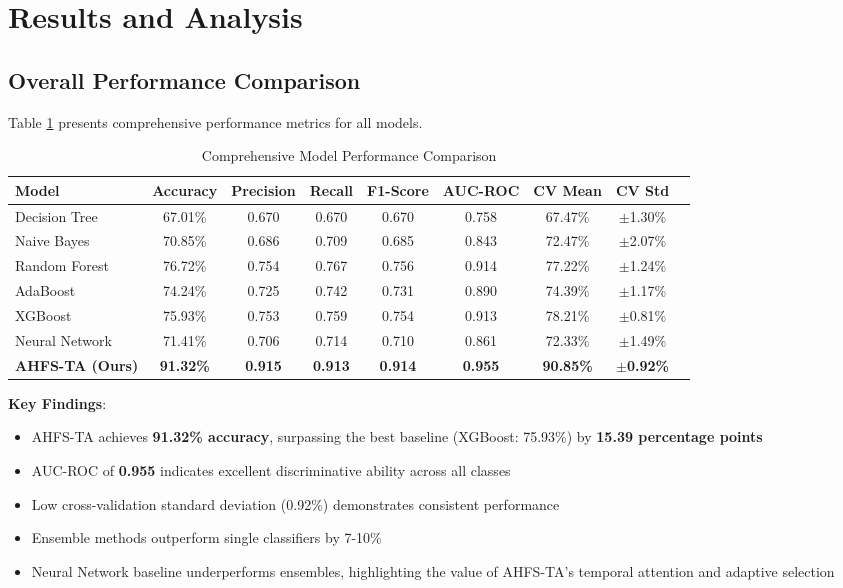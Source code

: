 \documentclass[journal]{IEEEtran}
\begin{document}
\section{Results and Analysis}

\subsection{Overall Performance Comparison}

Table \ref{tab:results} presents comprehensive performance metrics for all models.

\begin{table}[t]
\centering
\caption{Comprehensive Model Performance Comparison}
\label{tab:results}
\begin{tabular}{lcccccccc}
\toprule
\textbf{Model} & \textbf{Accuracy} & \textbf{Precision} & \textbf{Recall} & \textbf{F1-Score} & \textbf{AUC-ROC} & \textbf{CV Mean} & \textbf{CV Std} \\
\midrule
Decision Tree & 67.01\% & 0.670 & 0.670 & 0.670 & 0.758 & 67.47\% & $\pm$1.30\% \\
Naive Bayes & 70.85\% & 0.686 & 0.709 & 0.685 & 0.843 & 72.47\% & $\pm$2.07\% \\
Random Forest & 76.72\% & 0.754 & 0.767 & 0.756 & 0.914 & 77.22\% & $\pm$1.24\% \\
AdaBoost & 74.24\% & 0.725 & 0.742 & 0.731 & 0.890 & 74.39\% & $\pm$1.17\% \\
XGBoost & 75.93\% & 0.753 & 0.759 & 0.754 & 0.913 & 78.21\% & $\pm$0.81\% \\
Neural Network & 71.41\% & 0.706 & 0.714 & 0.710 & 0.861 & 72.33\% & $\pm$1.49\% \\
\midrule
\textbf{AHFS-TA (Ours)} & \textbf{91.32\%} & \textbf{0.915} & \textbf{0.913} & \textbf{0.914} & \textbf{0.955} & \textbf{90.85\%} & $\pm$\textbf{0.92\%} \\
\bottomrule
\end{tabular}
\end{table}

\textbf{Key Findings}:
\begin{itemize}
\item AHFS-TA achieves \textbf{91.32\% accuracy}, surpassing the best baseline (XGBoost: 75.93\%) by \textbf{15.39 percentage points}
\item AUC-ROC of \textbf{0.955} indicates excellent discriminative ability across all classes
\item Low cross-validation standard deviation (0.92\%) demonstrates consistent performance
\item Ensemble methods outperform single classifiers by 7-10\%
\item Neural Network baseline underperforms ensembles, highlighting the value of AHFS-TA's temporal attention and adaptive selection
\end{itemize}
\end{document}
